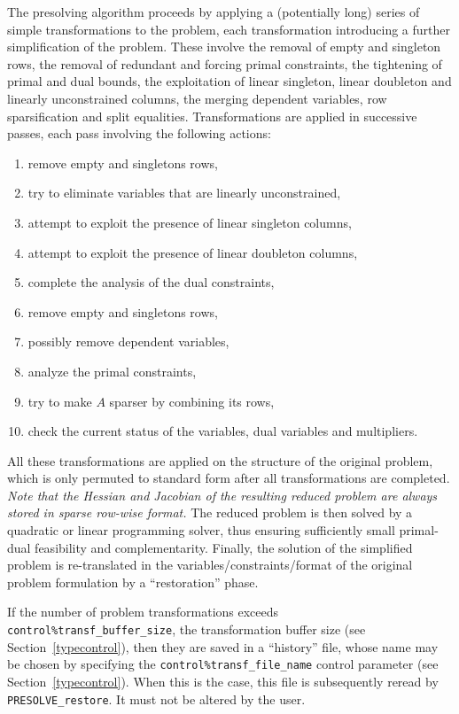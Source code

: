 \documentclass{galahad}
\newcommand{\packagename}{PRESOLVE}
\begin{document}
The presolving algorithm proceeds by applying a (potentially long) series of
simple transformations to the problem, each transformation introducing a
further simplification of the problem. These involve the removal of empty and
singleton rows, the removal of redundant and forcing primal constraints, the
tightening of primal and dual bounds, the exploitation of linear singleton,
linear doubleton and linearly unconstrained columns, the merging dependent
variables, row sparsification and split equalities. Transformations are
applied in successive passes, each pass involving the following actions:
\begin{enumerate}
\item remove empty and singletons rows,
\item try to eliminate variables that are linearly unconstrained,
\item attempt to exploit the presence of linear singleton columns,
\item attempt to exploit the presence of linear doubleton columns,
\item complete the analysis of the dual constraints,
\item remove empty and singletons rows, 
\item possibly remove dependent variables,
\item analyze the primal constraints, 
\item try to make $A$ sparser by combining its rows,
\item check the current status of the variables, dual variables
      and multipliers.
\end{enumerate}
All these transformations are applied on the structure of the original
problem, which is only permuted to standard form after all transformations are
completed. \emph{Note that the Hessian and Jacobian of the resulting reduced
problem are always stored in sparse row-wise format.} The reduced problem is
then solved by a quadratic or linear programming solver, thus ensuring
sufficiently small primal-dual feasibility and complementarity. Finally, the
solution of the simplified problem is re-translated in the
variables/constraints/format of the original problem formulation by a
``restoration'' phase.

If the number of problem transformations exceeds {\tt
control\%transf\_buffer\_size},  the transformation buffer size (see
Section~\ref{typecontrol}), then they are saved in a ``history'' file, whose
name may be chosen by specifying the {\tt control\%transf\_file\_name} control
parameter (see Section~\ref{typecontrol}).  When this is the case, this file
is subsequently reread by {\tt \packagename\_restore}. It must not be altered
by the user.
\end{document}
